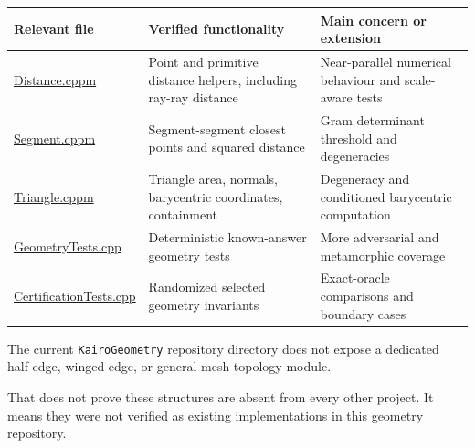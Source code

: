 {\def\LTcaptype{none} %
\begin{longtable}[]{@{}
  >{\raggedright\arraybackslash}p{}
  >{\raggedright\arraybackslash}p{}
  >{\raggedright\arraybackslash}p{}@{}}
\toprule\noalign{}
\begin{minipage}[b]{\linewidth}\raggedright
Relevant file
\end{minipage} & \begin{minipage}[b]{\linewidth}\raggedright
Verified functionality
\end{minipage} & \begin{minipage}[b]{\linewidth}\raggedright
Main concern or extension
\end{minipage} \\
\midrule\noalign{}
\endhead
\bottomrule\noalign{}
\endlastfoot
\href{https://github.com/swayam8624/KairoGeometry/blob/master/Distance.cppm?utm_source=chatgpt.com}{Distance.cppm} & Point and primitive distance helpers, including ray-ray distance & Near-parallel numerical behaviour and scale-aware tests \\
\href{https://github.com/swayam8624/KairoGeometry/blob/master/Segment.cppm?utm_source=chatgpt.com}{Segment.cppm} & Segment-segment closest points and squared distance & Gram determinant threshold and degeneracies \\
\href{https://github.com/swayam8624/KairoGeometry/blob/master/Triangle.cppm?utm_source=chatgpt.com}{Triangle.cppm} & Triangle area, normals, barycentric coordinates, containment & Degeneracy and conditioned barycentric computation \\
\href{https://github.com/swayam8624/KairoGeometry/blob/master/tests/GeometryTests.cpp?utm_source=chatgpt.com}{GeometryTests.cpp} & Deterministic known-answer geometry tests & More adversarial and metamorphic coverage \\
\href{https://github.com/swayam8624/KairoGeometry/blob/master/tests/CertificationTests.cpp?utm_source=chatgpt.com}{CertificationTests.cpp} & Randomized selected geometry invariants & Exact-oracle comparisons and boundary cases \\
\end{longtable}
}

The current \texttt{KairoGeometry} repository directory does not expose a dedicated half-edge, winged-edge, or general mesh-topology module.

That does not prove these structures are absent from every other project. It means they were not verified as existing implementations in this geometry repository.

